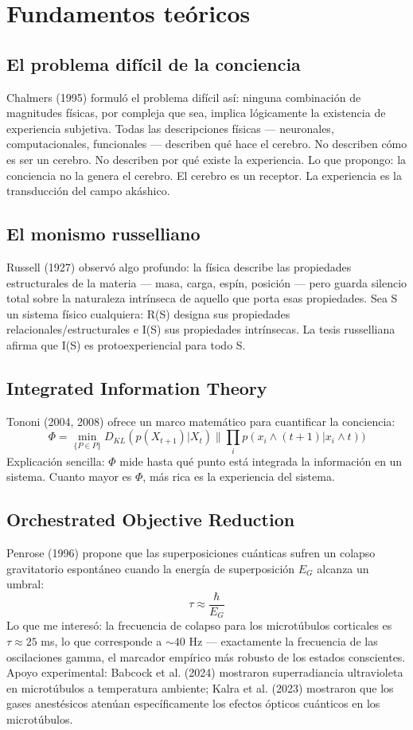 \section{Fundamentos teóricos}
\subsection{El problema difícil de la conciencia}
Chalmers (1995) formuló el problema difícil así: ninguna combinación de magnitudes físicas, por compleja que sea, implica lógicamente la existencia de experiencia subjetiva. Todas las descripciones físicas --- neuronales, computacionales, funcionales --- describen qué hace el cerebro. No describen cómo es ser un cerebro. No describen por qué existe la experiencia. Lo que propongo: la conciencia no la genera el cerebro. El cerebro es un receptor. La experiencia es la transducción del campo akáshico.

\subsection{El monismo russelliano}
Russell (1927) observó algo profundo: la física describe las propiedades estructurales de la materia --- masa, carga, espín, posición --- pero guarda silencio total sobre la naturaleza intrínseca de aquello que porta esas propiedades. Sea S un sistema físico cualquiera: R(S) designa sus propiedades relacionales/estructurales e I(S) sus propiedades intrínsecas. La tesis russelliana afirma que I(S) es protoexperiencial para todo S.

\subsection{Integrated Information Theory}
Tononi (2004, 2008) ofrece un marco matemático para cuantificar la conciencia:
\begin{equation}
\Phi = \min_{\{P \in P\}} D_{KL}(p(X_{t+1})|X_{t}) \parallel \prod_{i} p(x_{i} \land (t+1)|x_{i} \land t))
\end{equation}
Explicación sencilla: $\Phi$ mide hasta qué punto está integrada la información en un sistema. Cuanto mayor es $\Phi$, más rica es la experiencia del sistema.

\subsection{Orchestrated Objective Reduction}
Penrose (1996) propone que las superposiciones cuánticas sufren un colapso gravitatorio espontáneo cuando la energía de superposición $E_G$ alcanza un umbral:
\begin{equation}
\tau \approx \frac{\hbar}{E_G}
\end{equation}
Lo que me interesó: la frecuencia de colapso para los microtúbulos corticales es $\tau \approx 25$ ms, lo que corresponde a $\sim 40$ Hz --- exactamente la frecuencia de las oscilaciones gamma, el marcador empírico más robusto de los estados conscientes. Apoyo experimental: Babcock et al. (2024) mostraron superradiancia ultravioleta en microtúbulos a temperatura ambiente; Kalra et al. (2023) mostraron que los gases anestésicos atenúan específicamente los efectos ópticos cuánticos en los microtúbulos.

